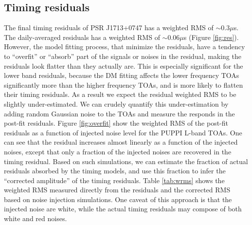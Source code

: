 \subsection{Timing residuals}
\label{sec:res}

The final timing residuals of PSR J1713+0747 has a weighted RMS of $\sim 0.3\mu$s. The daily-averaged residuals has a weighted RMS of $\sim 0.06\mu$s (Figure \ref{fig:res}).
However, the model fitting process, that minimize the residuals, have a tendency to ``overfit'' or 
``absorb'' part of the signals or noises in the residual, making the residuals
look flatter than they actually are. 
This is especially significant for the lower band residuals, because
the DM fitting affects the lower frequency TOAs significantly more than the
higher frequency TOAs, and is more likely to flatten their timing residuals. 
As a result we expect the residual weighted RMS to be slightly under-estimated. We can crudely quantify
this under-estimation by adding random Gaussian noise to the TOAs and
measure the responds in the post-fit residuals. Figure \ref{fig:overfit} show
the weighted RMS of the post-fit residuals as a function of injected noise level for the PUPPI L-band TOAs. 
One can see that the residual increases almost linearly as a function of the
injected noises, except that only a fraction of the injected noises are
recovered in the timing residual.
Based on such simulations, we
can estimate the fraction of actual residuals absorbed by the timing models, and use this fraction to infer the ``corrected amplitude'' of the timing residuals. 
Table \ref{tab:wrms} shows the weighted RMS measured directly from the residuals 
and the corrected RMS based on noise injection simulations. One caveat 
of this approach is that the injected noise are white, while the actual timing
residuals may compose of both white and red noises. 


